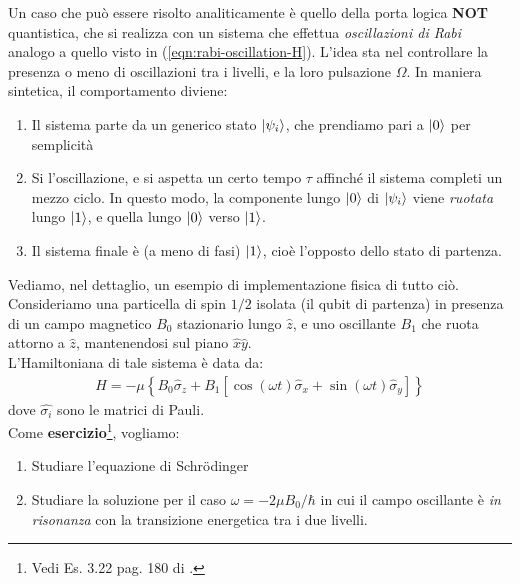 \documentclass[../../InformazioneQuantistica.tex]{subfiles}
\begin{document}
Un caso che può essere risolto analiticamente è quello della porta logica \textbf{NOT} quantistica, che si realizza con un sistema che effettua \textit{oscillazioni di Rabi} analogo a quello visto in (\ref{eqn:rabi-oscillation-H}). L'idea sta nel controllare la presenza o meno di oscillazioni tra i livelli, e la loro pulsazione $\Omega$. In maniera sintetica, il comportamento diviene:
\begin{enumerate}
\item Il sistema parte da un generico stato $\Ket{\psi_i}$, che prendiamo pari a $\Ket{0}$ per semplicità
\item Si  l'oscillazione, e si aspetta un certo tempo $\tau$ affinché il sistema completi un mezzo ciclo. In questo modo, la componente lungo $\Ket{0}$ di $\Ket{\psi_i}$ viene \textit{ruotata} lungo $\Ket{1}$, e quella lungo $\Ket{0}$ verso $\Ket{1}$.
\item Il sistema finale è (a meno di fasi) $\Ket{1}$, cioè l'opposto dello stato di partenza.
\end{enumerate}

Vediamo, nel dettaglio, un esempio di implementazione fisica di tutto ciò.\\
Consideriamo una particella di spin $1/2$ isolata (il qubit di partenza) in presenza di un campo magnetico $B_0$ stazionario lungo $\hat{z}$, e uno oscillante $B_1$ che ruota attorno a $\hat{z}$, mantenendosi sul piano $\hat{x}\hat{y}$.\\
L'Hamiltoniana di tale sistema è data da:
\begin{align*}
H = - \mu \left\{ B_0 \hat{\sigma}_z + B_1 [\cos(\omega t) \hat{\sigma}_x + \sin(\omega t) \hat{\sigma}_y]\right\}
\end{align*}
dove $\hat{\sigma_i}$ sono le matrici di Pauli.\\

Come \textbf{esercizio}\footnote{Vedi Es. 3.22 pag. 180 di \cite{benenti}.}, vogliamo:
\begin{enumerate}
\item Studiare l'equazione di Schr\"odinger
\item Studiare la soluzione per il caso $\omega = - 2\mu B_0/\hbar$ in cui il campo oscillante è \textit{in risonanza} con la transizione energetica tra i due livelli.
\end{enumerate}
\end{document}
